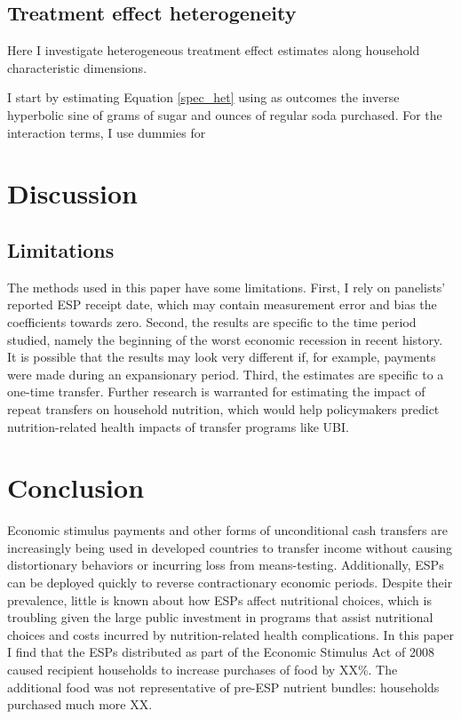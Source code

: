 \documentclass[12pt]{article}
\begin{document}
\subsection{Treatment effect heterogeneity}

Here I investigate heterogeneous treatment effect estimates along household characteristic dimensions.

I start by estimating Equation \ref{spec_het} using as outcomes the inverse hyperbolic sine of grams of sugar and ounces of regular soda purchased. For the interaction terms, I use dummies for

\section{Discussion} \label{discussion}



\subsection{Limitations}

The methods used in this paper have some limitations. First, I rely on panelists' reported ESP receipt date, which may contain measurement error and bias the coefficients towards zero. Second, the results are specific to the time period studied, namely the beginning of the worst economic recession in recent history. It is possible that the results may look very different if, for example, payments were made during an expansionary period. Third, the estimates are specific to a one-time transfer. Further research is warranted for estimating the impact of repeat transfers on household nutrition, which would help policymakers predict nutrition-related health impacts of transfer programs like UBI.


\section{Conclusion} \label{conclusion}

Economic stimulus payments and other forms of unconditional cash transfers are increasingly being used in developed countries to transfer income without causing distortionary behaviors or incurring loss from means-testing. Additionally, ESPs can be deployed quickly to reverse contractionary economic periods. Despite their prevalence, little is known about how ESPs affect nutritional choices, which is troubling given the large public investment in programs that assist nutritional choices and costs incurred by nutrition-related health complications. In this paper I find that the ESPs distributed as part of the Economic Stimulus Act of 2008 caused recipient households to increase purchases of food by XX\%. The additional food was not representative of pre-ESP nutrient bundles: households purchased much more XX.
\end{document}
